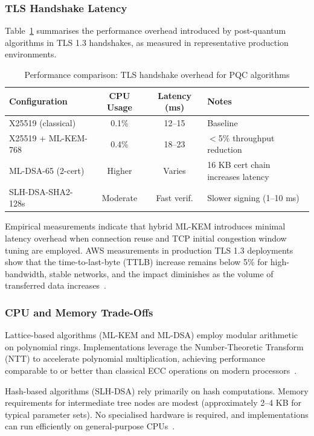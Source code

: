 \documentclass[12pt,a4paper]{article}
\begin{document}
\subsubsection{TLS Handshake Latency}

Table~\ref{tab:tls-performance} summarises the performance overhead introduced by post-quantum algorithms in TLS 1.3 handshakes, as measured in representative production environments.

\begin{table}[htbp]
\centering
\caption{Performance comparison: TLS handshake overhead for PQC algorithms}
\label{tab:tls-performance}
\begin{tabular}{lccp{5cm}}
\toprule
\textbf{Configuration} & \textbf{CPU Usage} & \textbf{Latency (ms)} & \textbf{Notes} \\
\midrule
X25519 (classical) & 0.1\% & 12–15 & Baseline \\
X25519 + ML-KEM-768 & 0.4\% & 18–23 & $<$5\% throughput reduction \\
ML-DSA-65 (2-cert) & Higher & Varies & 16 KB cert chain increases latency \\
SLH-DSA-SHA2-128s & Moderate & Fast verif. & Slower signing (1–10 ms) \\
\bottomrule
\end{tabular}
\end{table}

Empirical measurements indicate that hybrid ML-KEM introduces minimal latency overhead when connection reuse and TCP initial congestion window tuning are employed. AWS measurements in production TLS 1.3 deployments show that the time-to-last-byte (TTLB) increase remains below 5\% for high-bandwidth, stable networks, and the impact diminishes as the volume of transferred data increases~\cite{kampanakis-pqtls-impact-2024,aws-mlkem-tls-performance-2024}.

\subsubsection{CPU and Memory Trade-Offs}

Lattice-based algorithms (ML-KEM and ML-DSA) employ modular arithmetic on polynomial rings. Implementations leverage the Number-Theoretic Transform (NTT) to accelerate polynomial multiplication, achieving performance comparable to or better than classical ECC operations on modern processors~\cite{nist-fips-203-2024,nist-fips-204-2024}.

Hash-based algorithms (SLH-DSA) rely primarily on hash computations. Memory requirements for intermediate tree nodes are modest (approximately 2–4 KB for typical parameter sets). No specialised hardware is required, and implementations can run efficiently on general-purpose CPUs~\cite{nist-fips-205-2024}.
\end{document}
